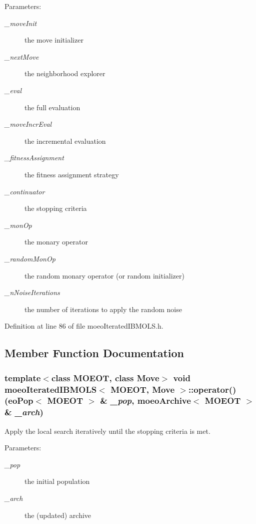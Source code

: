 \begin{Desc}
\item[Parameters:]
\begin{description}
\item[{\em \_\-move\-Init}]the move initializer \item[{\em \_\-next\-Move}]the neighborhood explorer \item[{\em \_\-eval}]the full evaluation \item[{\em \_\-move\-Incr\-Eval}]the incremental evaluation \item[{\em \_\-fitness\-Assignment}]the fitness assignment strategy \item[{\em \_\-continuator}]the stopping criteria \item[{\em \_\-mon\-Op}]the monary operator \item[{\em \_\-random\-Mon\-Op}]the random monary operator (or random initializer) \item[{\em \_\-n\-Noise\-Iterations}]the number of iterations to apply the random noise \end{description}
\end{Desc}


Definition at line 86 of file moeo\-Iterated\-IBMOLS.h.

\subsection{Member Function Documentation}
\subsubsection{\setlength{\rightskip}{0pt plus 5cm}template$<$class MOEOT, class Move$>$ void \bf{moeo\-Iterated\-IBMOLS}$<$ MOEOT, Move $>$::operator() (eo\-Pop$<$ MOEOT $>$ \& {\em \_\-pop}, \bf{moeo\-Archive}$<$ MOEOT $>$ \& {\em \_\-arch})\hspace{0.3cm}{\tt  [inline]}}\label{classmoeoIteratedIBMOLS_52d4aa19a93c69ed0c2246c62821e76e}


Apply the local search iteratively until the stopping criteria is met. 

\begin{Desc}
\item[Parameters:]
\begin{description}
\item[{\em \_\-pop}]the initial population \item[{\em \_\-arch}]the (updated) archive \end{description}
\end{Desc}


